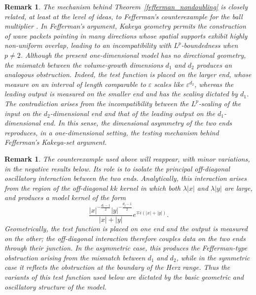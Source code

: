 \documentclass[12pt]{amsart}
\newtheorem{remark}[theorem]{Remark}
\begin{document}
\begin{remark}\label{r53}
The mechanism behind Theorem~\ref{fefferman_nondoubling} is closely
related, at least at the level of ideas, to Fefferman's counterexample
for the ball multiplier \cite{Fefferman}. In Fefferman's argument,
Kakeya geometry permits the construction of wave packets pointing in
many directions whose spatial supports exhibit highly non-uniform
overlap, leading to an incompatibility with \(L^p\)-boundedness when
\(p\ne2\). Although the present one-dimensional model has no directional
geometry, the mismatch between the volume-growth dimensions \(d_1\)
and \(d_2\) produces an analogous obstruction. Indeed, the test function
is placed on the larger end, whose measure on an interval of length
comparable to \(\varepsilon\) scales like \(\varepsilon^{d_2}\), whereas
the leading output is measured on the smaller end and has the scaling
dictated by \(d_1\). The contradiction arises from the incompatibility
between the \(L^p\)-scaling of the input on the \(d_2\)-dimensional end
and that of the leading output on the \(d_1\)-dimensional end. In this
sense, the dimensional asymmetry of the two ends reproduces, in a
one-dimensional setting, the testing mechanism behind Fefferman's
Kakeya-set argument.
\end{remark}

\begin{remark}\label{r54}
The counterexample used above will reappear, with minor variations, in
the negative results below. Its role is to isolate the principal
off-diagonal oscillatory interaction between the two ends. Analytically,
this interaction arises from the region of the off-diagonal \(kk\)
kernel in which both \(\lambda|x|\) and \(\lambda|y|\) are large, and
produces a model kernel of the form
\begin{equation*}
    \frac{|x|^{-\frac{d_\ell-1}{2}}
    |y|^{-\frac{d_j-1}{2}}}{|x|+|y|}
    e^{\mp i(|x|+|y|)}.
\end{equation*}
Geometrically, the test function is placed on one end and the output is
measured on the other; the off-diagonal interaction therefore couples
data on the two ends through their junction. In the asymmetric case,
this produces the Fefferman-type obstruction arising from the mismatch
between \(d_1\) and \(d_2\), while in the symmetric case it reflects the
obstruction at the boundary of the Herz range. Thus the variants of this
test function used below are dictated by the basic geometric and
oscillatory structure of the model.
\end{remark}
\end{document}
